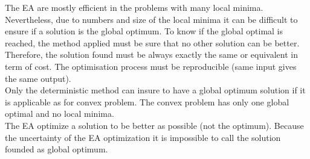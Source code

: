 The EA are mostly efficient in the problems with many local minima. Nevertheless, due to numbers and size of the local minima it can be difficult to ensure if a solution is the global optimum. 
To know if the global optimal is reached, the method applied must be sure that no other solution can be better. Therefore, the solution found must be always exactly the same or equivalent in term of cost. The optimisation process must be reproducible (same input gives the same output).\\
 Only the deterministic method can insure to have a global optimum solution  if it is applicable as for convex problem. The convex problem has only one global optimal and no local minima. \\%
  The EA optimize a solution to be better as possible (not the optimum). Because the uncertainty of the EA optimization it is impossible to call the solution founded as global optimum.
 
